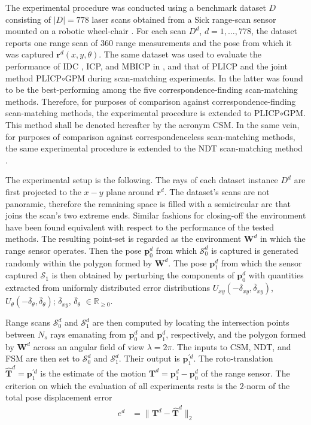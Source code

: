 The experimental procedure was conducted using a benchmark dataset $D$
consisting of $|D| = 778$ laser scans obtained from a Sick range-scan sensor
mounted on a robotic wheel-chair \cite{dataset_link}. For
each scan $D^d$, $d = 1,\dots,778$, the dataset reports one range scan of $360$
range measurements and the pose from which it was captured
$\bm{r}^d(x,y,\theta)$.  The same dataset was used to evaluate the performance
of IDC \cite{LuMilios}, ICP, and MBICP in \cite{mbicp}, and that of PLICP and
the joint method PLICP$\circ$GPM during scan-matching experiments. In
\cite{plicp} the latter was found to be the best-performing among the five
correspondence-finding scan-matching methods. Therefore, for purposes of
comparison against correspondence-finding scan-matching methods, the
experimental procedure is extended to PLICP$\circ$GPM. This method shall be
denoted hereafter by the acronym CSM. In the same vein, for purposes of
comparison against correspondenceless scan-matching methods, the same
experimental procedure is extended to the NDT scan-matching method \cite{ndt1}.

The experimental setup is the following. The rays of each dataset instance
$D^d$ are first projected to the $x-y$ plane around $\bm{r}^d$. The dataset's
scans are not panoramic, therefore the remaining space is filled with a
semicircular arc that joins the scan's two extreme ends. Similar fashions for
closing-off the environment have been found equivalent with respect to the
performance of the tested methods. The resulting point-set is regarded as the
environment $\bm{W}^d$ in which the range sensor operates.  Then the pose
$\bm{p}_0^d$ from which $\mathcal{S}_0^d$ is captured is generated randomly
within the polygon formed by $\bm{W}^d$. The pose $\bm{p}_1^d$ from which the
sensor captured $\mathcal{S}_1$ is then obtained by perturbing the components
of $\bm{p}_0^d$ with quantities extracted from uniformly distributed error
distributions $U_{xy}(-\overline{\delta}_{xy}, \overline{\delta}_{xy})$,
$U_{\theta}(-\overline{\delta}_{\theta}, \overline{\delta}_{\theta})$;
$\overline{\delta}_{xy}$, $\overline{\delta}_\theta$ $\in \mathbb{R}_{\geq 0}$.

Range scans $\mathcal{S}_0^d$ and $\mathcal{S}_1^d$ are then computed by
locating the intersection points between $N_s$ rays emanating from $\bm{p}_0^d$
and $\bm{p}_1^d$, respectively, and the polygon formed by $\bm{W}^d$ across an
angular field of view $\lambda = 2\pi$. The inputs to CSM, NDT, and FSM are
then set to $\mathcal{S}_0^d$ and $\mathcal{S}_1^d$. Their output is
$\bm{p}_1^{\prime d}$. The roto-translation
$\hat{\bm{T}}^d = \bm{p}_1^{\prime d}$ is the estimate of the motion
$\bm{T}^d = \bm{p}_1^d - \bm{p}_0^d$ of the range sensor. The criterion on
which the evaluation of all experiments rests is the $2$-norm of the total pose
displacement error
\begin{align}
  e^d &= \| \bm{T}^d - \hat{\bm{T}}^d \|_2
  \label{eq:rototranslation_error}
\end{align}

